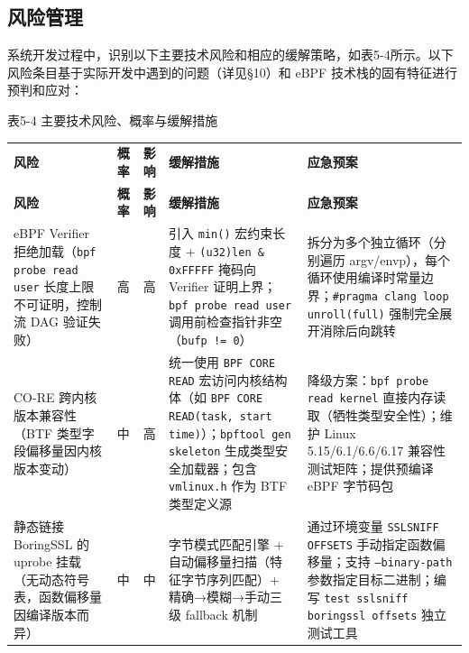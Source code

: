\documentclass[a4paper]{ctexart}
\makeatletter
\renewcommand{\_}{%
  \ifmmode
    \nfss@text{\textunderscore}%
  \else
    \textunderscore\discretionary{}{}{}%
  \fi}
\makeatother
\begin{document}
\subsection{风险管理}



系统开发过程中，识别以下主要技术风险和相应的缓解策略，如表5-4所示。以下风险条目基于实际开发中遇到的问题（详见§10）和 eBPF 技术栈的固有特征进行预判和应对：




\medskip
{\centering\small
表5-4 主要技术风险、概率与缓解措施\par
\vspace{3pt}
\setlength{\tabcolsep}{6pt}
\renewcommand{\arraystretch}{1.1}
\begin{longtable}{>{\raggedright\arraybackslash}p{3.8cm} c c >{\raggedright\arraybackslash}p{4.0cm} >{\raggedright\arraybackslash}p{4.0cm}}
\hline
\textbf{风险} & \textbf{概率} & \textbf{影响} & \textbf{缓解措施} & \textbf{应急预案} \\*
\hline
\endfirsthead
\hline
\textbf{风险} & \textbf{概率} & \textbf{影响} & \textbf{缓解措施} & \textbf{应急预案} \\
\hline
\endhead
\hline
\endfoot
\hline
\endlastfoot
eBPF Verifier 拒绝加载（\texttt{bpf\_probe\_read\_user} 长度上限不可证明，控制流 DAG 验证失败） & 高 & 高 & 引入 \texttt{min()} 宏约束长度 + \texttt{(u32)len \& 0xFFFFF} 掩码向 Verifier 证明上界；\texttt{bpf\_probe\_read\_user} 调用前检查指针非空（\texttt{bufp != 0}） & 拆分为多个独立循环（分别遍历 argv/envp），每个循环使用编译时常量边界；\texttt{\#pragma clang loop unroll(full)} 强制完全展开消除后向跳转 \\*
\hline
CO-RE 跨内核版本兼容性（BTF 类型字段偏移量因内核版本变动） & 中 & 高 & 统一使用 \texttt{BPF\_CORE\_READ} 宏访问内核结构体（如 \texttt{BPF\_CORE\_READ(task, start\_time)}）；\texttt{bpftool gen skeleton} 生成类型安全加载器；包含 \texttt{vmlinux.h} 作为 BTF 类型定义源 & 降级方案：\texttt{bpf\_probe\_read\_kernel} 直接内存读取（牺牲类型安全性）；维护 Linux 5.15/6.1/6.6/6.17 兼容性测试矩阵；提供预编译 eBPF 字节码包 \\
\hline
静态链接 BoringSSL 的 uprobe 挂载（无动态符号表，函数偏移量因编译版本而异） & 中 & 中 & 字节模式匹配引擎 + 自动偏移量扫描（特征字节序列匹配）+ 精确→模糊→手动三级 fallback 机制 & 通过环境变量 \texttt{SSLSNIFF\_OFFSETS} 手动指定函数偏移量；支持 \texttt{--binary-path} 参数指定目标二进制；编写 \texttt{test\_sslsniff\_boringssl\_offsets} 独立测试工具 \\
\hline

\end{longtable}}
\end{document}

